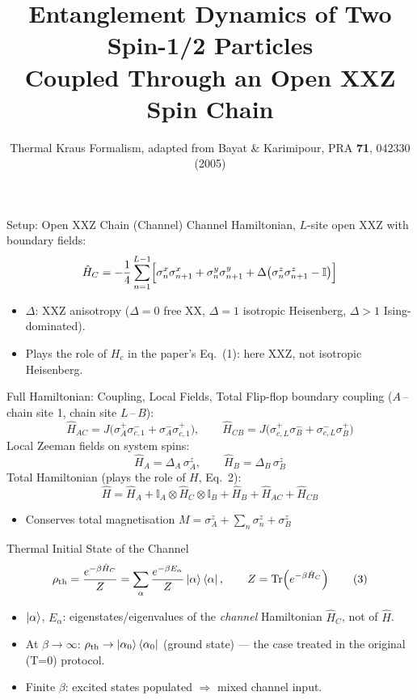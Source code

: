 \documentclass[11pt]{beamer}
\title[Thermal Channel: Eqs.\ (1)--(8)]{Entanglement Dynamics of Two Spin-1/2 Particles\\ Coupled Through an Open XXZ Spin Chain}
\subtitle{Thermal Kraus Formalism, adapted from Bayat \& Karimipour, PRA \textbf{71}, 042330 (2005)}
\author{}
\date{}
\renewcommand{\Tr}{\mathrm{Tr}}
\newcommand{\sigx}{\sigma^x}
\newcommand{\sigy}{\sigma^y}
\newcommand{\sigz}{\sigma^z}
\newcommand{\sigp}{\sigma^+}
\newcommand{\sigm}{\sigma^-}
\begin{document}
\begin{frame}
\titlepage
\end{frame}

\begin{frame}{Setup: Open XXZ Chain (Channel)}
Channel Hamiltonian, $L$-site open XXZ with boundary fields:
\[
\hat H_C = -\frac14\sum_{n=1}^{L-1}\Bigl[\sigx_n\sigx_{n+1}+\sigy_n\sigy_{n+1}+\Delta\bigl(\sigz_n\sigz_{n+1}-\mathbb{I}\bigr)\Bigr]
\]

\begin{itemize}
\item $\Delta$: XXZ anisotropy ($\Delta=0$ free XX, $\Delta=1$ isotropic Heisenberg, $\Delta>1$ Ising-dominated).
\item Plays the role of $H_c$ in the paper's Eq.\ (1): here XXZ, not isotropic Heisenberg.
\end{itemize}
\end{frame}

\begin{frame}{Full Hamiltonian: Coupling, Local Fields, Total}
Flip-flop boundary coupling ($A$\,--\,chain site 1, chain site $L$\,--\,$B$):
\[
\hat H_{AC} = J\bigl(\sigp_A\sigm_{c,1}+\sigm_A\sigp_{c,1}\bigr),\qquad
\hat H_{CB} = J\bigl(\sigp_{c,L}\sigm_B+\sigm_{c,L}\sigp_B\bigr)
\]
Local Zeeman fields on system spins:
\[
\hat H_A = \Delta_A\,\sigz_A, \qquad \hat H_B = \Delta_B\,\sigz_B
\]
Total Hamiltonian (plays the role of $H$, Eq.\ 2):
\[
\boxed{\;\hat H = \hat H_A + \mathbb{I}_A\otimes\hat H_C\otimes\mathbb{I}_B + \hat H_B + \hat H_{AC}+\hat H_{CB}\;}
\]
\begin{itemize}
\item Conserves total magnetisation $M=\sigz_A+\sum_n\sigz_n+\sigz_B$
\end{itemize}
\end{frame}

\begin{frame}{Thermal Initial State of the Channel}
\[
\rho_{\text{th}} = \frac{e^{-\beta \hat H_C}}{Z} = \sum_\alpha \frac{e^{-\beta E_\alpha}}{Z}\ket{\alpha}\bra{\alpha}, \qquad Z = \Tr\!\left(e^{-\beta \hat H_C}\right) \tag{3}
\]

\begin{itemize}
\item $\ket{\alpha}$, $E_\alpha$: eigenstates/eigenvalues of the \emph{channel} Hamiltonian $\hat H_C$, not of $\hat H$.
\item At $\beta\to\infty$: $\rho_{\text{th}}\to\ket{\alpha_0}\bra{\alpha_0}$ (ground state) — the case treated in the original (T=0) protocol.
\item Finite $\beta$: excited states populated $\Rightarrow$ mixed channel input.
\end{itemize}
\end{frame}
\end{document}

